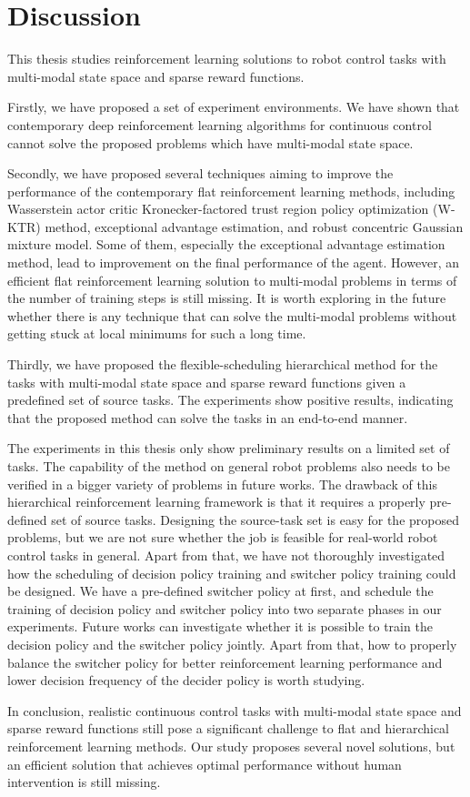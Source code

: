\chapter{Discussion}
This thesis studies reinforcement learning solutions to robot control tasks with multi-modal state space and sparse reward functions.

Firstly, we have proposed a set of experiment environments. We have shown that contemporary deep reinforcement learning algorithms for continuous control cannot solve the proposed problems which have multi-modal state space. 

Secondly, we have proposed several techniques aiming to improve the performance of the contemporary flat reinforcement learning methods, including Wasserstein actor critic Kronecker-factored trust region policy optimization (W-KTR) method, exceptional advantage estimation, and robust concentric Gaussian mixture model. Some of them, especially the exceptional advantage estimation method, lead to improvement on the final performance of the agent. However, an efficient flat reinforcement learning solution to multi-modal problems in terms of the number of training steps is still missing. It is worth exploring in the future whether there is any technique that can solve the multi-modal problems without getting stuck at local minimums for such a long time.

Thirdly, we have proposed the flexible-scheduling hierarchical method for the tasks with multi-modal state space and sparse reward functions given a predefined set of source tasks. The experiments show positive results, indicating that the proposed method can solve the tasks in an end-to-end manner.

The experiments in this thesis only show preliminary results on a limited set of tasks. The capability of the method on general robot problems also needs to be verified in a bigger variety of problems in future works. The drawback of this hierarchical reinforcement learning framework is that it requires a properly pre-defined set of source tasks. Designing the source-task set is easy for the proposed problems, but we are not sure whether the job is feasible for real-world robot control tasks in general. Apart from that, we have not thoroughly investigated how the scheduling of decision policy training and switcher policy training could be designed. We have a pre-defined switcher policy at first, and schedule the training of decision policy and switcher policy into two separate phases in our experiments. Future works can investigate whether it is possible to train the decision policy and the switcher policy jointly. Apart from that, how to properly balance the switcher policy for better reinforcement learning performance and lower decision frequency of the decider policy is worth studying.

In conclusion, realistic continuous control tasks with multi-modal state space and sparse reward functions still pose a significant challenge to flat and hierarchical reinforcement learning methods. Our study proposes several novel solutions, but an efficient solution that achieves optimal performance without human intervention is still missing.